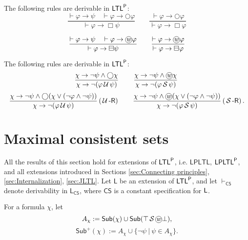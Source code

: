 \documentclass[envcountsect,envcountsame,oribibl,orivec]{llncs}
\newcommand*\circled[1]{\tikz[baseline=(char.base)]{
		\node[shape=circle,draw,inner sep=0.4pt] (char) {#1};}}
\newcommand{\lneg}{\neg}
\newcommand{\lrule}[2]{\displaystyle{\frac{#1}{#2}}}
\newcommand{\limplies}{\rightarrow}
\newcommand{\lnext}{\bigcirc}
\newcommand{\lalways}{\Box}
\newcommand{\lsofar}{\boxminus}
\newcommand{\luntil}{{\,\mathcal{U}\,}}
\newcommand{\lsince}{{\,\mathcal{S}\,}}
\newcommand{\wprevious}{\circled{\textit{w}}}
\newcommand{\uindrule}{\ensuremath{(\luntil\textsf{-R})}}
\newcommand{\sindrule}{\ensuremath{(\lsince\textsf{-R})}}
\newcommand{\LTL}{\textsf{LTL}}
\newcommand{\LTLp}{\LTL^{\sf P}}
\newcommand{\LPLTLp}{\textsf{LPLTL}^{\sf P}}
\newcommand{\LPLTL}{\textsf{LPLTL}}
\newcommand{\CS}{\textsf{CS}}
\renewcommand{\phi}{\varphi}
\newcommand{\Sub}{\mathsf{Sub}}
\begin{document}
\begin{lemma}\label{lem: derivable ind-rules}
	The following rules are derivable in $\LTLp$:
\[
\lrule{\vdash \phi \to \psi \quad \vdash\phi \to \lnext \phi}{\vdash \phi \to \lalways \psi}
\qquad
\lrule{\vdash \phi \to \lnext \phi}{\vdash \phi \to \lalways \phi}
\]

\[
\lrule{\vdash \phi \to \psi \quad \vdash\phi \to \wprevious \phi}{\vdash \phi \to \lsofar \psi}
\qquad
\lrule{\vdash \phi \to \wprevious \phi}{\vdash \phi \to \lsofar \phi}
\]
	
\end{lemma}

\begin{lemma}
The following rules are derivable in $\LTLp$:
\[  
\lrule{\chi \limplies \lneg \psi \land \lnext \chi}{\chi \limplies \lneg(\phi \luntil \psi)}\, 
\qquad 
\lrule{\chi \limplies \lneg \psi \land \wprevious \chi}{\chi \limplies \lneg(\phi \lsince \psi)}\, 
\]
\[  
\lrule{\chi \limplies \lneg \psi \land \lnext (\chi \lor (\lnot \phi \land \lnot \psi)) }{\chi \limplies \lneg(\phi \luntil \psi)}\,\uindrule \,
 \qquad
 \lrule{\chi \limplies \lneg \psi \land \wprevious (\chi \lor (\lnot \phi \land \lnot \psi)) }{\chi \limplies \lneg(\phi \lsince \psi)}\,\sindrule \, . 
\]
\end{lemma}



\section{Maximal consistent sets}
\label{sec:Maximal consistent sets}

All the results of this section hold for extensions of $\LTLp$, i.e. $\LPLTL$, $\LPLTLp$, and all extensions introduced in Sections \ref{sec:Connecting principles}, \ref{sec:Internalization}, \ref{sec:JLTL}. Let $\mathsf{L}$ be an extension of $\LTLp$, and let $\vdash_\CS$ denote derivability in $\mathsf{L}_\CS$, where $\CS$ is a constant specification for ${\sf L}$.


For a formula $\chi$, let 
$$A_\chi := \Sub(\chi) \cup \Sub(\top \lsince \wprevious \bot) ,$$
%
$$\Sub^+(\chi) := A_\chi \cup \{ \neg \psi \ |\  \psi \in A_\chi \}.$$
\end{document}
